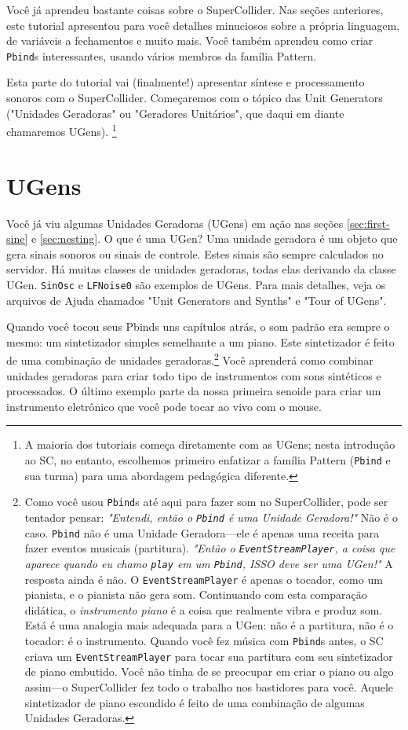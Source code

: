 Você já aprendeu bastante coisas sobre o SuperCollider. Nas seções anteriores, este tutorial apresentou para você detalhes minuciosos sobre a própria linguagem, de variáveis a fechamentos e muito mais. Você também aprendeu como criar \texttt{Pbind}s interessantes, usando vários membros da família Pattern.

Esta parte do tutorial vai (finalmente!) apresentar síntese e processamento sonoros com o SuperCollider. Começaremos com o tópico das Unit Generators ("Unidades Geradoras" ou "Geradores Unitários", que daqui em diante chamaremos UGens). \footnote{A maioria dos tutoriais começa diretamente com as UGens; nesta introdução ao SC, no entanto, escolhemos primeiro enfatizar a família Pattern (\texttt{Pbind} e sua turma) para uma abordagem pedagógica diferente.}

\section{UGens}

Você já viu algumas Unidades Geradoras (UGens) em ação nas seções \ref{sec:first-sine} e \ref{sec:nesting}. O que é uma UGen? Uma unidade geradora é um objeto que gera sinais sonoros ou sinais de controle. Estes sinais são sempre calculados no servidor. Há muitas classes de unidades geradoras, todas elas derivando da classe UGen. \texttt{SinOsc} e \texttt{LFNoise0} são exemplos de UGens. Para mais detalhes, veja os arquivos de Ajuda chamados "Unit Generators and Synths" e "Tour of UGens". 

Quando você tocou seus Pbinds uns capítulos atrás, o som padrão era sempre o mesmo: um sintetizador simples semelhante a um piano. Este sintetizador é feito de uma combinação de unidades geradoras.\footnote{Como você usou \texttt{Pbind}s até aqui para fazer som no SuperCollider, pode ser tentador pensar: \textit{"Entendi, então o \texttt{Pbind} é uma Unidade Geradora!"} Não é o caso. \texttt{Pbind} não é uma Unidade Geradora---ele é apenas uma receita para fazer eventos musicais (partitura). \textit{"Então o \texttt{EventStreamPlayer}, a coisa que aparece quando eu chamo \texttt{play} em um \texttt{Pbind}, ISSO deve ser uma UGen!"} A resposta ainda é não. O \texttt{EventStreamPlayer} é apenas o tocador, como um pianista, e o pianista não gera som. Continuando com esta comparação didática, o \emph{instrumento piano} é a coisa que realmente vibra e produz som. Está é uma analogia mais adequada para a UGen: não é a partitura, não é o tocador: é o instrumento. Quando você fez música com \texttt{Pbind}s antes, o SC criava um \texttt{EventStreamPlayer} para tocar sua partitura com seu sintetizador de piano embutido. Você não tinha de se preocupar em criar o piano ou algo assim---o SuperCollider fez todo o trabalho nos bastidores para você. Aquele sintetizador de piano escondido é feito de uma combinação de algumas Unidades Geradoras.} Você aprenderá como combinar unidades geradoras para criar todo tipo de instrumentos com sons sintéticos e processados. O último exemplo parte da nossa primeira senoide para criar um instrumento eletrônico que você pode tocar ao vivo com o mouse.

